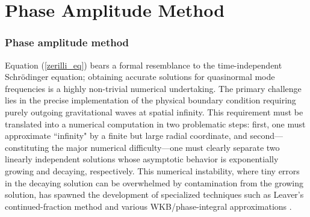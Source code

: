 
\chapter{Phase Amplitude Method}
\label{app:running_osc_params}

\subsection{Phase amplitude method}
\label{Formalism4}

Equation (\ref{zerilli_eq}) bears a formal resemblance to the time-independent Schrödinger equation; obtaining accurate solutions for quasinormal mode frequencies is a highly non-trivial numerical undertaking. The primary challenge lies in the precise implementation of the physical boundary condition requiring purely outgoing gravitational waves at spatial infinity. This requirement must be translated into a numerical computation in two problematic steps: first, one must approximate ``infinity" by a finite but large radial coordinate, and second—constituting the major numerical difficulty—one must clearly separate two linearly independent solutions whose asymptotic behavior is exponentially growing and decaying, respectively. This numerical instability, where tiny errors in the decaying solution can be overwhelmed by contamination from the growing solution, has spawned the development of specialized techniques such as Leaver’s continued-fraction method and various WKB/phase-integral approximations \cite{leaver_QNM_techniques_1985,Kokkotas_living_review}.

